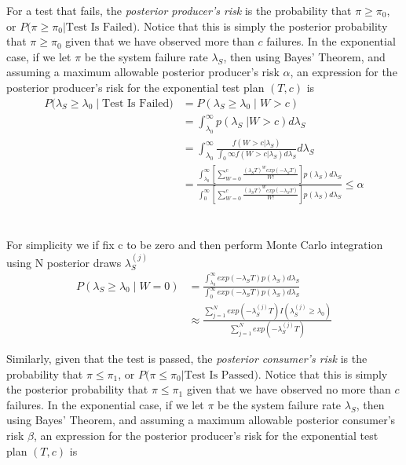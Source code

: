 \documentclass[12pt]{article}
\begin{document}
For a test that fails, the \emph{posterior producer's risk} is the probability
that $\pi \geq \pi_{0}$, or $P \text{(}\pi \ge \pi_0 \vert \text{Test Is
Failed)}$. Notice that this is simply the posterior probability that $\pi \ge
\pi_0$ given that we have observed more than $c$ failures. In the exponential
case, if we let $\pi$ be the system failure rate $\lambda_S$, then using Bayes'
Theorem, and assuming a maximum allowable posterior producer's risk $\alpha$, an
expression for the posterior producer's risk for the exponential test plan
$(T,c)$ is
$$
\begin{aligned}
    P(\lambda_S \geq \lambda_0 \; \vert \; \text{Test Is Failed)} &= P(\lambda_S \geq \lambda_0 \; \vert \; W > c) \\
	&= \int_{\lambda_0}^{\infty} p(\lambda_S \; \vert W > c) d\lambda_S \\
    &= \int_{\lambda_0}^{\infty} \frac{f(W > c \vert \lambda_S)}{\int_{0}{\infty} f(W > c \vert \lambda_S) d\lambda_S} d\lambda_S \\
    &= \frac{\int_{\lambda_0}^{\infty} [ \sum_{W=0}^c \frac{(\lambda_S T)^W exp(-\lambda_S T)}{W!}]p(\lambda_S)d\lambda_S} {\int_{0}^{\infty} [ \sum_{W=0}^c \frac{(\lambda_S T)^W exp(-\lambda_S T)}{W!}]p(\lambda_S)d\lambda_S} \leq \alpha
\end{aligned}
$$
\\
\\
For simplicity we if fix c to be zero and then perform Monte Carlo integration using N posterior draws $ \lambda_S^{(j)} $
$$
\begin{aligned}
	 P(\lambda_S \geq \lambda_0 \; \vert \; W = 0) &= \frac{\int_{\lambda_0}^{\infty} exp(-\lambda_S T)p(\lambda_S)d\lambda_S} {\int_{0}^{\infty} exp(-\lambda_S T)p(\lambda_S)d\lambda_S} \\
     &\approx \frac{\sum_{j = 1}^{N} exp(-\lambda_S^{(j)} T)I(\lambda_S^{(j)} \geq \lambda_0)} {\sum_{j = 1}^{N} exp(-\lambda_S^{(j)} T)}
\end{aligned}
$$

Similarly, given that the test is passed, the \emph{posterior
consumer's risk} is the
probability that $\pi \leq \pi_1$, or $P \text{(}\pi \leq \pi_0 \vert \text{Test Is
Passed)}$. Notice that this is simply the
posterior probability that $\pi \leq \pi_1$ given that we have
observed no more than $c$ failures. In the exponential
case, if we let $\pi$ be the system failure rate $\lambda_S$, then using Bayes'
Theorem, and assuming a maximum allowable posterior consumer's risk $\beta$, an
expression for the posterior producer's risk for the exponential test plan
$(T,c)$ is
\end{document}
